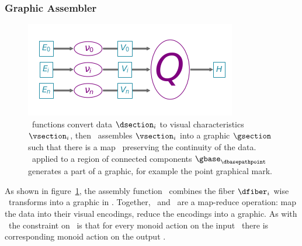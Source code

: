\documentclass[../main.tex]{subfiles}
\begin{document}
\subsubsection{Graphic Assembler \vmark}
\label{sec:artist_q}
\begin{figure}[H]
    \includegraphics[width=\textwidth]{figures/math/path_of_q}
    \caption{\vchannel\ functions convert data $\dsection_i$ to visual characteristics $\vsection_i$, then \vmark\ assembles $\vsection_i$ into a graphic $\gsection$ such that there is a map \vindex\ preserving the continuity of the data. \gsection\ applied to a region of connected components $\gbase_{\dbasepathpoint}$  generates a part of a graphic, for example the point graphical mark.} 
    \label{fig:artist_q}
\end{figure}

As shown in figure~\ref{fig:artist_q}, the assembly function \vmark\ combines the fiber $\dfiber_i$ wise \vchannel\ transforms into a graphic in \gtotal. Together, \vchannel\ and \vmark\ are a map-reduce operation: map the data into their visual encodings, reduce the encodings into a graphic. As with \vchannel\, the constraint on \vmark\ is that for every monoid action on the input \vsection\, there is corresponding monoid action on the output \gsection. 
\end{document}
